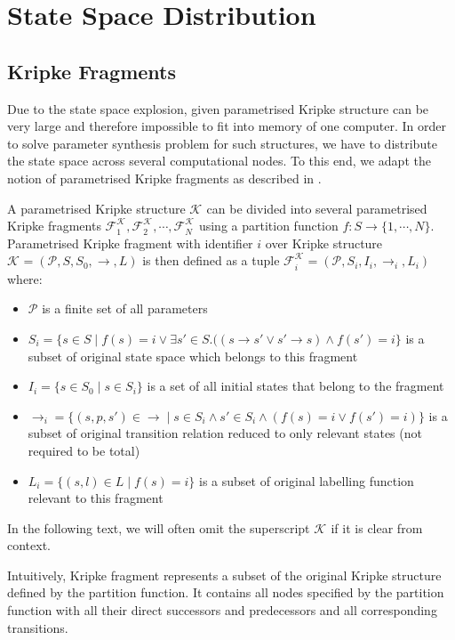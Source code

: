 \documentclass[12pt,oneside]{fithesis2}
\newcommand{\ks}[1][]{\ensuremath{\mathcal{K}_{#1}}}
\newcommand{\kf}[2]{\ensuremath{\mathcal{F}^{#2}_{#1}}}
\newcommand{\fullKs}{\ensuremath{ \ks = (\params, S, S_0, \trans{}, L) }}
\newcommand{\fullKf}[2]{\ensuremath{ \kf{#1}{#2} = (\params, S_{#1}, I_{i}, \trans{}_{#1}, L_{#1}) }}
\newcommand{\trans}[1]{\stackrel{#1}{\rightarrow}}
\newcommand{\params}{\mathcal{P}}
\begin{document}
	\chapter{State Space Distribution}
				
		\section{Kripke Fragments}
		
			Due to the state space explosion, given parametrised Kripke structure can be very large and therefore impossible to fit into memory of one computer. In order to solve parameter synthesis problem for such structures, we have to distribute the state space across several computational nodes. To this end, we adapt the notion of parametrised Kripke fragments as described in \cite{assumptions}.
			
			A parametrised Kripke structure $\ks$ can be divided into several parametrised Kripke fragments $\kf{1}{\ks}, \kf{2}{\ks}, \cdots , \kf{N}{\ks}$ using a partition function $f : S \rightarrow \{1, \cdots , N \}$. Parametrised Kripke fragment with identifier $i$ over Kripke structure $\fullKs$ is then defined as a tuple $\fullKf{i}{\ks}$ where:
			
			\begin{itemize}
				\item $\params$ is a finite set of all parameters
				\item $S_{i} = \{ s \in S \mid f(s) = i \vee \exists s'\in S. ((s \trans{} s' \vee s' \trans{} s) \wedge f(s') = i \}$ is a subset of original state space which belongs to this fragment
				\item $I_{i} = \{ s \in S_0 \mid s \in S_{i} \} $ is a set of all initial states that belong to the fragment
				\item $\trans{}_{i} = \{ (s, p, s') \in \trans{} \mid s \in S_{i} \wedge s' \in S_{i} \wedge (f(s) = i \vee f(s') = i) \}$ is a subset of original transition relation reduced to only relevant states (not required to be total)
				\item $L_{i} = \{ (s, l) \in L \mid f(s) = i \}$ is a subset of original labelling function relevant to this fragment
			\end{itemize}
						
			In the following text, we will often omit the superscript $\ks$ if it is clear from context.
			
			Intuitively, Kripke fragment represents a subset of the original Kripke structure defined by the partition function. It contains all nodes specified by the partition function with all their direct successors and predecessors and all corresponding transitions. 			
			
\end{document}
